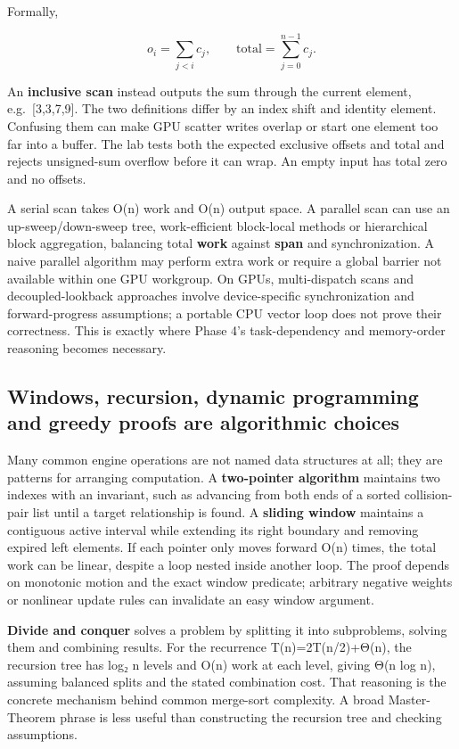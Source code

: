 Formally,

\[
o_i=\sum_{j<i}c_j,\qquad
\mathrm{total}=\sum_{j=0}^{n-1}c_j.
\]

An \textbf{inclusive scan} instead outputs the sum through the current element, e.g.~{[}3,3,7,9{]}. The two definitions differ by an index shift and identity element. Confusing them can make GPU scatter writes overlap or start one element too far into a buffer. The lab tests both the expected exclusive offsets and total and rejects unsigned-sum overflow before it can wrap. An empty input has total zero and no offsets.

A serial scan takes O(n) work and O(n) output space. A parallel scan can use an up-sweep/down-sweep tree, work-efficient block-local methods or hierarchical block aggregation, balancing total \textbf{work} against \textbf{span} and synchronization. A naive parallel algorithm may perform extra work or require a global barrier not available within one GPU workgroup. On GPUs, multi-dispatch scans and decoupled-lookback approaches involve device-specific synchronization and forward-progress assumptions; a portable CPU vector loop does not prove their correctness. This is exactly where Phase 4's task-dependency and memory-order reasoning becomes necessary.

\subsection{Windows, recursion, dynamic programming and greedy proofs are algorithmic choices}\label{05-engine-i-ch008-windows-recursion-dynamic-programming-and-greedy-proofs-are-algorithmic-choices}

Many common engine operations are not named data structures at all; they are patterns for arranging computation. A \textbf{two-pointer algorithm} maintains two indexes with an invariant, such as advancing from both ends of a sorted collision-pair list until a target relationship is found. A \textbf{sliding window} maintains a contiguous active interval while extending its right boundary and removing expired left elements. If each pointer only moves forward O(n) times, the total work can be linear, despite a loop nested inside another loop. The proof depends on monotonic motion and the exact window predicate; arbitrary negative weights or nonlinear update rules can invalidate an easy window argument.

\textbf{Divide and conquer} solves a problem by splitting it into subproblems, solving them and combining results. For the recurrence T(n)=2T(n/2)+Θ(n), the recursion tree has log₂ n levels and O(n) work at each level, giving Θ(n log n), assuming balanced splits and the stated combination cost. That reasoning is the concrete mechanism behind common merge-sort complexity. A broad Master-Theorem phrase is less useful than constructing the recursion tree and checking assumptions.

